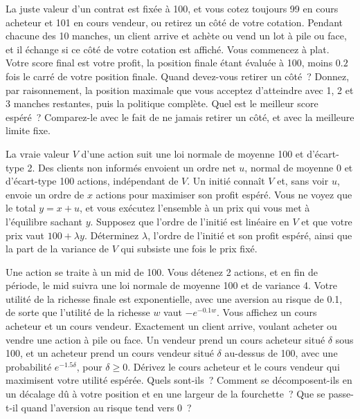 \begin{question}\label{iq:iv2:making-a-market:33}
La juste valeur d'un contrat est fixée à 100, et vous cotez toujours 99 en cours acheteur et 101 en cours vendeur, ou retirez un côté de votre cotation. Pendant chacune des 10 manches, un client arrive et achète ou vend un lot à pile ou face, et il échange si ce côté de votre cotation est affiché. Vous commencez à plat. Votre score final est votre profit, la position finale étant évaluée à 100, moins $0.2$ fois le carré de votre position finale. Quand devez-vous retirer un côté~? Donnez, par raisonnement, la position maximale que vous acceptez d'atteindre avec 1, 2 et 3 manches restantes, puis la politique complète. Quel est le meilleur score espéré~? Comparez-le avec le fait de ne jamais retirer un côté, et avec la meilleure limite fixe.
\end{question}

\begin{question}\label{iq:iv2:making-a-market:34}
La vraie valeur $V$ d'une action suit une loi normale de moyenne 100 et d'écart-type 2. Des clients non informés envoient un ordre net $u$, normal de moyenne 0 et d'écart-type 100 actions, indépendant de $V$. Un initié connaît $V$ et, sans voir $u$, envoie un ordre de $x$ actions pour maximiser son profit espéré. Vous ne voyez que le total $y = x + u$, et vous exécutez l'ensemble à un prix qui vous met à l'équilibre sachant $y$. Supposez que l'ordre de l'initié est linéaire en $V$ et que votre prix vaut $100 + \lambda y$. Déterminez $\lambda$, l'ordre de l'initié et son profit espéré, ainsi que la part de la variance de $V$ qui subsiste une fois le prix fixé.
\end{question}

\begin{question}\label{iq:iv2:making-a-market:35}
Une action se traite à un mid de 100. Vous détenez 2 actions, et en fin de période, le mid suivra une loi normale de moyenne 100 et de variance 4. Votre utilité de la richesse finale est exponentielle, avec une aversion au risque de 0.1, de sorte que l'utilité de la richesse $w$ vaut $-e^{-0.1 w}$. Vous affichez un cours acheteur et un cours vendeur. Exactement un client arrive, voulant acheter ou vendre une action à pile ou face. Un vendeur prend un cours acheteur situé $\delta$ sous 100, et un acheteur prend un cours vendeur situé $\delta$ au-dessus de 100, avec une probabilité $e^{-1.5\delta}$, pour $\delta \ge 0$. Dérivez le cours acheteur et le cours vendeur qui maximisent votre utilité espérée. Quels sont-ils~? Comment se décomposent-ils en un décalage dû à votre position et en une largeur de la fourchette~? Que se passe-t-il quand l'aversion au risque tend vers 0~?
\end{question}
